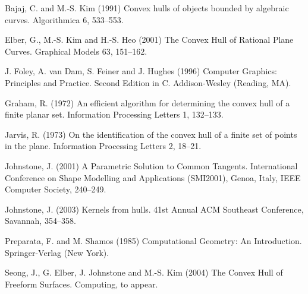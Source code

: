 \documentclass{sig-alternate}
\begin{document}

\begin{thebibliography}{99}

Bajaj, C. and M.-S. Kim (1991)
Convex hulls of objects bounded by algebraic curves.
Algorithmica 6, 533--553.

Elber, G., M.-S. Kim and H.-S. Heo (2001)
The Convex Hull of Rational Plane Curves.
Graphical Models 63, 151--162.

J. Foley, A. van Dam, S. Feiner and J. Hughes (1996)
Computer Graphics: Principles and Practice.
Second Edition in C.
Addison-Wesley (Reading, MA).

Graham, R. (1972)
An efficient algorithm for determining the convex hull of a finite planar set.
Information Processing Letters 1, 132--133.

Jarvis, R. (1973)
On the identification of the convex hull of a finite set of points
in the plane.
Information Processing Letters 2, 18--21.

Johnstone, J. (2001)
A Parametric Solution to Common Tangents.
International Conference on Shape Modelling and Applications (SMI2001),
Genoa, Italy, IEEE Computer Society, 240--249.

Johnstone, J. (2003)
Kernels from hulls.
41st Annual ACM Southeast Conference, Savannah, 354--358.

Preparata, F. and M. Shamos (1985)
Computational Geometry: An Introduction.
Springer-Verlag (New York).

Seong, J., G. Elber, J. Johnstone and M.-S. Kim (2004)
The Convex Hull of Freeform Surfaces.
Computing, to appear.

\end{thebibliography}

\balancecolumns
\end{document}
